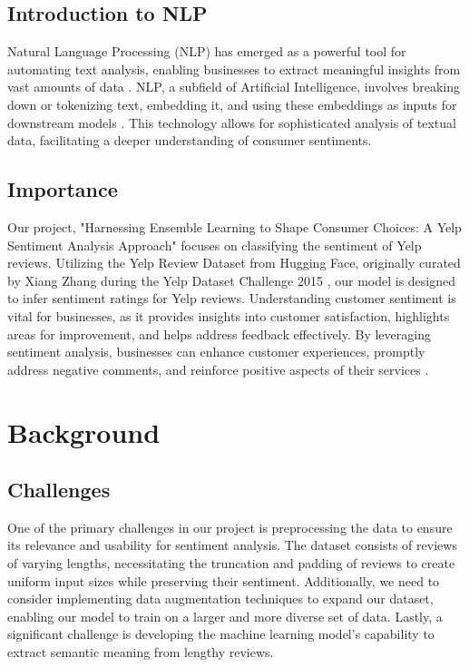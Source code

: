 \documentclass[12pt]{article}
\begin{document}
\subsection{Introduction to NLP}
Natural Language Processing (NLP) has emerged as a powerful tool for automating text analysis, enabling businesses to extract meaningful insights from vast amounts of data \citep{jurafsky2020speech}. NLP, a subfield of Artificial Intelligence, involves breaking down or tokenizing text, embedding it, and using these embeddings as inputs for downstream models \citep{manning1999foundations}. This technology allows for sophisticated analysis of textual data, facilitating a deeper understanding of consumer sentiments.

\subsection{Importance}
Our project, "Harnessing Ensemble Learning to Shape Consumer Choices: A Yelp Sentiment Analysis Approach" focuses on classifying the sentiment of Yelp reviews. Utilizing the Yelp Review Dataset from Hugging Face, originally curated by Xiang Zhang during the Yelp Dataset Challenge 2015 \citep{zhang2015sensitivity}, our model is designed to infer sentiment ratings for Yelp reviews. Understanding customer sentiment is vital for businesses, as it provides insights into customer satisfaction, highlights areas for improvement, and helps address feedback effectively. By leveraging sentiment analysis, businesses can enhance customer experiences, promptly address negative comments, and reinforce positive aspects of their services \citep{pang2008sentiment}.

\section{Background}

\subsection{Challenges}
One of the primary challenges in our project is preprocessing the data to ensure its relevance and usability for sentiment analysis. The dataset consists of reviews of varying lengths, necessitating the truncation and padding of reviews to create uniform input sizes while preserving their sentiment. Additionally, we need to consider implementing data augmentation techniques to expand our dataset, enabling our model to train on a larger and more diverse set of data. Lastly, a significant challenge is developing the machine learning model's capability to extract semantic meaning from lengthy reviews.
\end{document}
